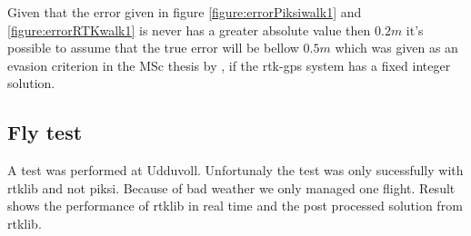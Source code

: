 Given that the error given in figure \ref{figure:errorPiksiwalk1} and \ref{figure:errorRTKwalk1} is never has a greater absolute value then $0.2m$ it's possible to assume that the true error will be bellow $0.5m$ which was given as an evasion criterion in the MSc thesis by \citep{Froelich}, if the \gls{rtk-gps} system has a fixed integer solution.
\subsection{Fly test}
A test was performed at Udduvoll. Unfortunaly the test was only sucessfully with rtklib and not piksi. Because of bad weather we only managed one flight. Result shows the performance of rtklib in real time and the post processed solution from rtklib.
\cleardoublepage
